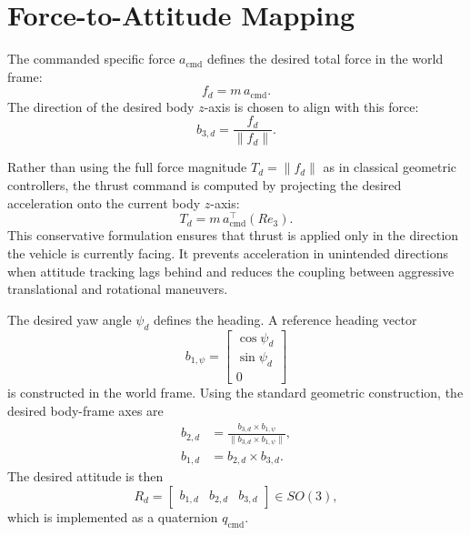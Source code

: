 \section{Force-to-Attitude Mapping}

The commanded specific force $a_{\mathrm{cmd}}$ defines the desired total force in
the world frame:
\begin{equation}
    f_d = m\,a_{\mathrm{cmd}}.
\end{equation}
The direction of the desired body $z$-axis is chosen to align with this force:
\begin{equation}
    b_{3,d} = \frac{f_d}{\|f_d\|}.
\end{equation}

Rather than using the full force magnitude $T_d = \|f_d\|$ as in classical
geometric controllers, the thrust command is computed by projecting the desired
acceleration onto the current body $z$-axis:
\begin{equation}
    T_d = m\,a_{\mathrm{cmd}}^\top (R e_3).
\end{equation}
This conservative formulation ensures that thrust is applied only in the
direction the vehicle is currently facing. It prevents acceleration in
unintended directions when attitude tracking lags behind and reduces
the coupling between aggressive translational and rotational maneuvers.

The desired yaw angle $\psi_d$ defines the heading. A reference heading vector
\begin{equation}
    b_{1,\psi} =
    \begin{bmatrix}
        \cos \psi_d \\[2pt]
        \sin \psi_d \\[2pt]
        0
    \end{bmatrix}
\end{equation}
is constructed in the world frame. Using the standard geometric construction,
the desired body-frame axes are
\begin{align}
    b_{2,d} &= \frac{b_{3,d} \times b_{1,\psi}}{\|b_{3,d} \times b_{1,\psi}\|},\\
    b_{1,d} &= b_{2,d} \times b_{3,d}.
\end{align}
The desired attitude is then
\begin{equation}
    R_d = \begin{bmatrix} b_{1,d} & b_{2,d} & b_{3,d} \end{bmatrix} \in SO(3),
\end{equation}
which is implemented as a quaternion $q_{\mathrm{cmd}}$.

